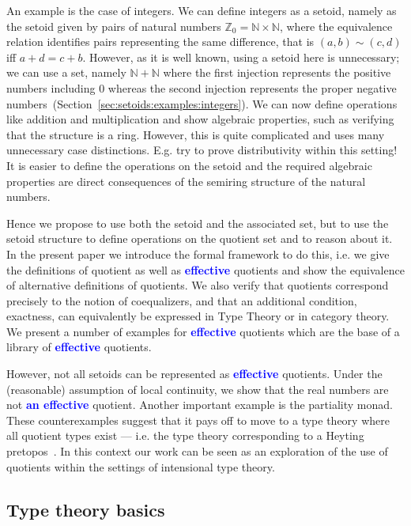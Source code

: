 \documentclass[envcountsame]{llncs}
\newcommand{\amend}[2][]{\textcolor{blue}{#2}}
\newcommand{\definable}{\amend[]{\textbf{effective }}}
\newcommand{\adefinable}{\amend[]{\textbf{an effective }}}
\newcommand{\N}{\mathbb{N}}
\newcommand{\Z}{\mathbb{Z}}
\begin{document}
An example is the case of integers. We can define integers as a
setoid, namely as the setoid given by pairs of natural numbers
$\Z_0=\N\times\N$, where the equivalence relation identifies pairs
representing the same difference, that is  $(a,b)\sim(c,d)$ if{f} $a+d=c+b$.
However, as it is well known, using a setoid here is unnecessary; we
can use a set, namely $\N+\N$ where the first injection represents the
positive numbers including $0$ whereas the second injection represents
the proper negative numbers~(Section~\ref{sec:setoids:examples:integers}). We can now define operations like
addition and multiplication and show algebraic properties,
such as verifying that the structure is a ring. However, this is
quite complicated and uses many unnecessary case
distinctions. E.g. try to prove distributivity within this setting!
It is easier to define the operations on the setoid and the required
algebraic properties are direct consequences of the semiring structure
of the natural numbers.

Hence we propose to use both the setoid
and the associated set, but to use the setoid structure to define
operations on the quotient set and to reason about it. In the present
paper we introduce the formal framework to do this, i.e. we give the definitions of  quotient as well as \definable quotients and show the
equivalence of alternative definitions of quotients. We also verify that quotients
correspond precisely to the notion of coequalizers, and that an
additional condition, exactness, can equivalently be expressed in Type
Theory or in category theory. We present a number of examples for
\definable quotients which are the base of a library of \definable
quotients.

However, not all setoids can be represented as \definable
quotients. Under the (reasonable) assumption of local continuity, we
show that the real numbers are not \adefinable quotient. Another
important example is the partiality monad. These counterexamples
suggest that it pays off to move to a type theory where all quotient
types exist --- i.e. the type theory corresponding to a Heyting
pretopos~\cite{maietti1999effective}. In this context our work can be
seen as an exploration of the use of quotients within the settings of
intensional type theory.

\subsection{Type theory basics}
\label{sec:type-theory-basics}
\end{document}
